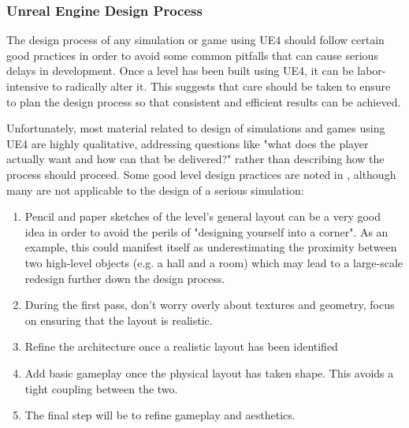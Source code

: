 \subsubsection{Unreal Engine Design Process}
The design process of any simulation or game using UE4 should follow certain good practices in order to avoid some common pitfalls that can cause serious delays in development. Once a level has been built using UE4, it can be labor-intensive to radically alter it\cite[p.~454]{Rouse2005GamePractice}. This suggests that care should be taken to ensure to plan the design process so that consistent and efficient results can be achieved.

Unfortunately, most material related to design of simulations and games using UE4 are highly qualitative, addressing questions like "what does the player actually want and how can that be delivered?" rather than describing how the process should proceed. Some good level design practices are noted in \cite{Rouse2005GamePractice}, although many are not applicable to the design of a serious simulation:
\begin{enumerate}
    \item Pencil and paper sketches of the level's general layout can be a very good idea in order to avoid the perils of "designing yourself into a corner". As an example, this could manifest itself as underestimating the proximity between two high-level objects (e.g. a hall and a room) which may lead to a large-scale redesign further down the design process.
    \item During the first pass, don't worry overly about textures and geometry, focus on ensuring that the layout is realistic.
    \item Refine the architecture once a realistic layout has been identified
    \item Add basic gameplay once the physical layout has taken shape. This avoids a tight coupling between the two.
    \item The final step will be to refine gameplay and aesthetics.
\end{enumerate}

